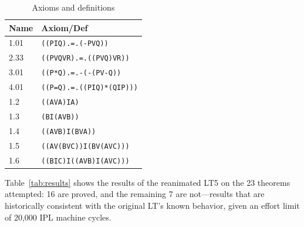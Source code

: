 \documentclass[journal]{IEEEtran}
\begin{document}
\begin{table}[h]
\centering
\caption{Axioms and definitions}
\label{tab:axioms}
\begin{tabular}{ll}
\toprule
\textbf{Name} & \textbf{Axiom/Def}\\
\midrule
1.01  & \texttt{((PIQ).=.(-PVQ))}\\
2.33  & \texttt{((PVQVR).=.((PVQ)VR))}\\
3.01  & \texttt{((P*Q).=.-(-(PV-Q))}\\
4.01  & \texttt{((P=Q).=.((PIQ)*(QIP)))}\\
1.2   & \texttt{((AVA)IA)}\\
1.3   & \texttt{(BI(AVB))}\\
1.4   & \texttt{((AVB)I(BVA))}\\
1.5   & \texttt{((AV(BVC))I(BV(AVC)))}\\
1.6   & \texttt{((BIC)I((AVB)I(AVC)))}\\
\bottomrule
\end{tabular}
\end{table}

Table~\ref{tab:results} shows the results of the reanimated LT5 on the
23 theorems attempted: 16 are proved, and the remaining 7 are
not---results that are historically consistent with the original LT's
known behavior, given an effort limit of 20,000 IPL machine cycles.
\end{document}
